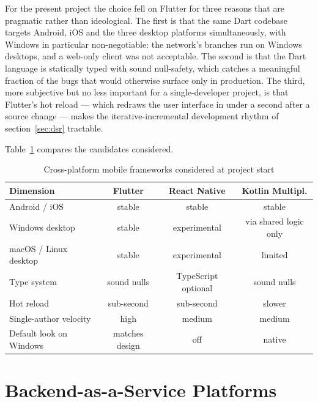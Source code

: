 For the present project the choice fell on Flutter for three reasons that are pragmatic rather than ideological. The first is that the same Dart codebase targets Android, iOS and the three desktop platforms simultaneously, with Windows in particular non-negotiable: the network's branches run on Windows desktops, and a web-only client was not acceptable. The second is that the Dart language is statically typed with sound null-safety, which catches a meaningful fraction of the bugs that would otherwise surface only in production. The third, more subjective but no less important for a single-developer project, is that Flutter's hot reload --- which redraws the user interface in under a second after a source change --- makes the iterative-incremental development rhythm of section~\ref{sec:dsr} tractable.

Table~\ref{tab:frameworks} compares the candidates considered.

{\singlespacing
\begin{table}[h]
  \caption{Cross-platform mobile frameworks considered at project start}
  \label{tab:frameworks}
  \centering
  \begin{tabular}{lccc}
    \toprule
    \textbf{Dimension}         & \textbf{Flutter} & \textbf{React Native} & \textbf{Kotlin Multipl.}\\
    \midrule
    Android / iOS              & stable           & stable                & stable\\
    Windows desktop            & stable           & experimental          & via shared logic only\\
    macOS / Linux desktop      & stable           & experimental          & limited\\
    Type system                & sound nulls      & TypeScript optional   & sound nulls\\
    Hot reload                 & sub-second       & sub-second            & slower\\
    Single-author velocity     & high             & medium                & medium\\
    Default look on Windows    & matches design   & off                   & native\\
    \bottomrule
  \end{tabular}
\end{table}
}

\section{Backend-as-a-Service Platforms}
\label{sec:baas}

